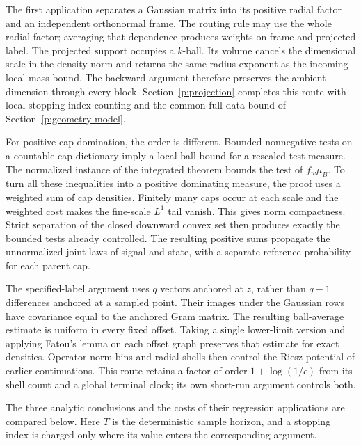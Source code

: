 The first application separates a Gaussian matrix into its positive radial
factor and an independent orthonormal frame. The routing rule may use the
whole radial factor; averaging that dependence produces weights on frame
and projected label. The projected support occupies a \(k\)-ball.
Its volume cancels the dimensional scale in the density norm and returns
the same radius exponent as the incoming local-mass bound. The backward
argument therefore preserves the ambient dimension through every block.
Section~\ref{p:projection} completes this route with local stopping-index
counting and the common full-data bound of Section~\ref{p:geometry-model}.

For positive cap domination, the order is different. Bounded nonnegative
tests on a countable cap dictionary imply a local ball bound for a rescaled
test measure. The normalized instance of the integrated theorem bounds the
test of \(f_w\mu_B\). To turn all these inequalities into a positive
dominating measure, the proof uses a weighted sum of cap densities.
Finitely many caps occur at each scale and the weighted cost makes the
fine-scale \(L^1\) tail vanish. This gives norm compactness. Strict
separation of the closed downward convex set then produces exactly the
bounded tests already controlled. The resulting positive sums propagate
the unnormalized joint laws of signal and state, with a separate reference
probability for each parent cap.

The specified-label argument uses \(q\) vectors anchored at \(z\),
rather than \(q-1\) differences anchored at a sampled point. Their images
under the Gaussian rows have covariance equal to the anchored Gram matrix.
The resulting ball-average estimate is uniform in every fixed offset.
Taking a single lower-limit version and applying Fatou's lemma on each
offset graph preserves that estimate for exact densities. Operator-norm
bins and radial shells then control the Riesz potential of earlier
continuations. This route retains a factor of order
\(1+\log(1/\epsilon)\) from its shell count and a global terminal clock;
its own short-run argument controls both.

The three analytic conclusions and the costs of their regression
applications are compared below. Here \(T\) is the deterministic sample
horizon, and a stopping index is charged only where its value enters the
corresponding argument.

